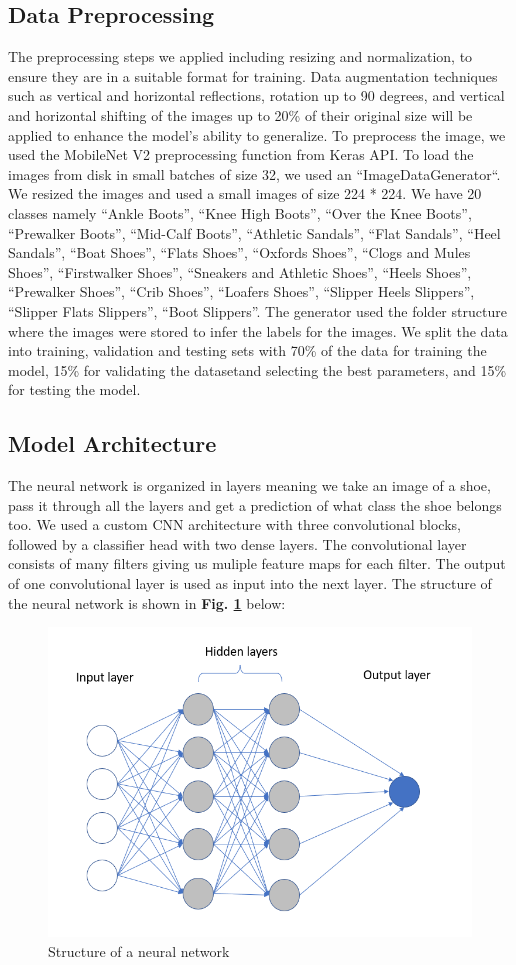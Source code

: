\documentclass[11pt,a4paper]{article}
\begin{document}
\subsection{Data Preprocessing}
The preprocessing steps we applied including resizing and normalization, to ensure they are in a suitable format for training. Data augmentation techniques such as vertical and horizontal reflections, rotation up to 90 degrees, and vertical and horizontal shifting of the images up to 20\% of their original size will be applied to enhance the model's ability to generalize.  To preprocess the image, we used the MobileNet V2 preprocessing function from Keras API.  To load the images from disk in small batches of size 32, we used an ``ImageDataGenerator``.  We resized the images and used a small images of size 224 * 224. We have 20 classes namely ``Ankle Boots'', ``Knee High Boots'', ``Over the Knee Boots'', ``Prewalker Boots'', ``Mid-Calf Boots'', ``Athletic Sandals'', ``Flat Sandals'', ``Heel Sandals'', ``Boat Shoes'', ``Flats Shoes'', ``Oxfords Shoes'', ``Clogs and Mules Shoes'',  ``Firstwalker Shoes'', ``Sneakers and Athletic Shoes'', ``Heels Shoes'', ``Prewalker Shoes'', ``Crib Shoes'', ``Loafers Shoes'', ``Slipper Heels Slippers'', ``Slipper Flats Slippers'', ``Boot Slippers''. The generator used the folder structure where the images were stored to infer the labels for the images. We split the data into training, validation and testing sets with 70\% of the data for training the model, 15\% for validating the datasetand selecting the best parameters, and 15\% for testing the model. 
\subsection{Model Architecture}
The neural network is organized in layers meaning we take an image of a shoe, pass it through all the layers and get a prediction of what class the shoe belongs too. We used a custom CNN architecture with three convolutional blocks, followed by a classifier head with two dense layers. The convolutional layer consists of many filters giving us muliple feature maps for each filter.  The output of one convolutional layer is used as input into the next layer. The structure of the neural network is shown in \textbf{Fig. \ref{neural_network}} below:

 \begin{figure}[h!]
\centering
  \includegraphics[width=0.75\linewidth]{neural network.png}
  \caption{Structure of a neural network}
  \label{neural_network}
\end{figure}
\end{document}
